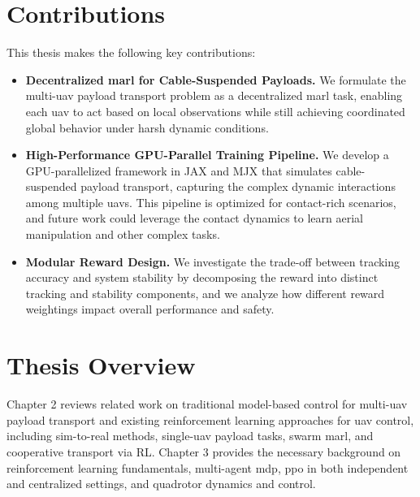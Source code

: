 \section{Contributions}
This thesis makes the following key contributions:
\begin{itemize}
    \item \textbf{Decentralized \gls{marl} for Cable-Suspended Payloads.} We formulate the multi-\gls{uav} payload transport problem as a decentralized \gls{marl} task, enabling each \gls{uav} to act based on local observations while still achieving coordinated global behavior under harsh dynamic conditions.
    \item \textbf{High-Performance GPU-Parallel Training Pipeline.} We develop a GPU-parallelized framework in JAX and MJX that simulates cable-suspended payload transport, capturing the complex dynamic interactions among multiple \glspl{uav}. This pipeline is optimized for contact-rich scenarios, and future work could leverage the contact dynamics to learn aerial manipulation and other complex tasks.
    \item \textbf{Modular Reward Design.} We investigate the trade-off between tracking accuracy and system stability by decomposing the reward into distinct tracking and stability components, and we analyze how different reward weightings impact overall performance and safety.
\end{itemize}

\section{Thesis Overview}
Chapter 2 reviews related work on traditional model-based control for multi-\gls{uav} payload transport and existing reinforcement learning approaches for \gls{uav} control, including sim-to-real methods, single-\gls{uav} payload tasks, swarm \gls{marl}, and cooperative transport via RL. Chapter 3 provides the necessary background on reinforcement learning fundamentals, multi-agent \gls{mdp}, \gls{ppo} in both independent and centralized settings, and quadrotor dynamics and control. 